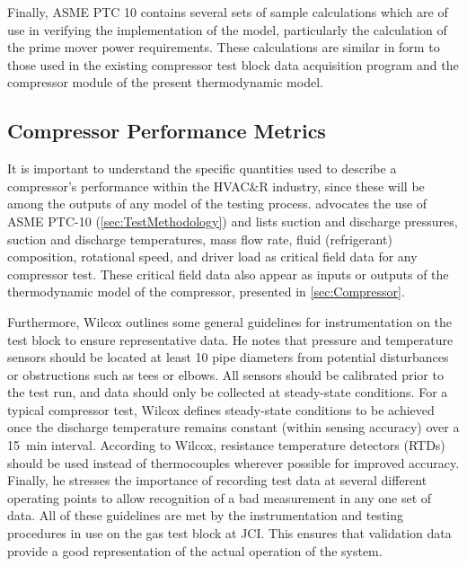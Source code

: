Finally, ASME PTC 10 contains several sets of sample calculations 
which are of use in verifying the implementation of the model, 
particularly the calculation of the prime mover power requirements.
These calculations are similar in form to those used in the existing
compressor test block data acquisition program and the compressor
module of the present thermodynamic model.

\subsection{Compressor Performance Metrics}
It is important to understand the specific quantities used 
to describe a compressor's performance within the HVAC\&R%
industry, since these will be among the outputs of any model of the testing process. 
\textcite{wilcox2007} advocates the use of ASME PTC-10 (\cref{sec:TestMethodology}) and lists
  suction and discharge pressures,
  suction and discharge temperatures,
  mass flow rate,
  fluid (refrigerant) composition,
  rotational speed, and
  driver load
as critical field data for any compressor test.
These critical field data also appear as inputs or outputs 
of the thermodynamic model of the compressor, presented in \cref{sec:Compressor}.

Furthermore, Wilcox outlines some general guidelines 
for instrumentation on the test block to ensure representative data.  
He notes that pressure and temperature sensors should be located 
at least 10 pipe diameters from potential disturbances or obstructions such as tees or elbows.  
All sensors should be calibrated prior to the test run, 
and data should only be collected at steady-state conditions.  
For a typical compressor test, Wilcox defines steady-state conditions to be achieved 
once the discharge temperature remains constant (within sensing accuracy) over a \SI{15}{\minute} interval. 
According to Wilcox, resistance temperature detectors (RTDs)%
should be used instead of thermocouples wherever possible for improved accuracy. 
Finally, he stresses the importance of recording test data at several different operating points 
to allow recognition of a bad measurement in any one set of data.
All of these guidelines are met by the instrumentation and testing procedures
in use on the  gas test block at JCI.
This ensures that validation data provide a good representation
of the actual operation of the system.

